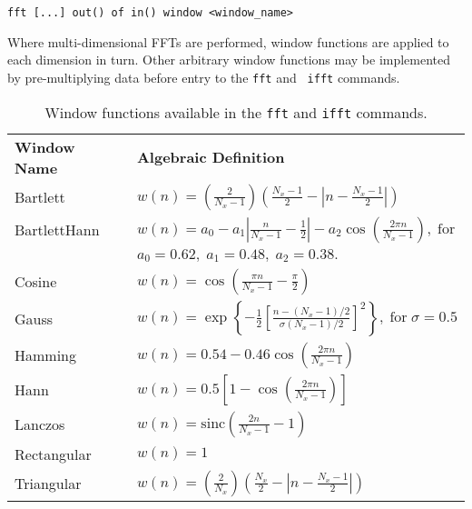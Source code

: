 \begin{verbatim}
fft [...] out() of in() window <window_name>
\end{verbatim}

\noindent Where multi-dimensional FFTs are performed, window functions are
applied to each dimension in turn.  Other arbitrary window functions may be
implemented by pre-multiplying data before entry to the {\tt fft} and {\tt
ifft} commands.

\begin{table}
\newlength{\wfgap}
\setlength{\wfgap}{3mm}
\begin{tabular}{ll}
{\bf Window Name} & {\bf Algebraic Definition} \vspace{\wfgap}\\
Bartlett     & $\displaystyle w(n) = \left( \frac{2}{N_x-1} \right) \left( \frac{N_x-1}{2} - \left| n - \frac{N_x-1}{2} \right| \right)$ \vspace{\wfgap}\\
BartlettHann & $\displaystyle w(n) = a_0 - a_1\left|\frac{n}{N_x-1}-\frac{1}{2}\right| - a_2\cos\left(\frac{2\pi n}{N_x-1}\right),\;\textrm{for}$ \vspace{2mm}\\
             & $a_0=0.62,\; a_1=0.48,\; a_2=0.38.$ \vspace{\wfgap}\\
Cosine       & $\displaystyle w(n) = \cos\left(\frac{\pi n}{N_x-1} - \frac{\pi}{2} \right)$ \vspace{\wfgap}\\
Gauss        & $\displaystyle w(n) = \exp \left\{ -\frac{1}{2}\left[ \frac{n-(N_x-1)/2}{\sigma(N_x-1)/2} \right]^2 \right\},\;\textrm{for}\;\sigma=0.5$ \vspace{\wfgap}\\
Hamming      & $\displaystyle w(n) = 0.54 - 0.46\cos\left(\frac{2\pi n}{N_x-1}\right)$ \vspace{\wfgap}\\
Hann         & $\displaystyle w(n) = 0.5 \left[ 1 - \cos\left(\frac{2\pi n}{N_x-1}\right) \right]$ \vspace{\wfgap}\\
Lanczos      & $\displaystyle w(n) = \mathrm{sinc}\left( \frac{2n}{N_x-1} - 1 \right)$ \vspace{\wfgap}\\
Rectangular  & $\displaystyle w(n) = 1$ \vspace{\wfgap}\\
Triangular   & $\displaystyle w(n) = \left( \frac{2}{N_x} \right) \left( \frac{N_x}{2} - \left| n - \frac{N_x-1}{2} \right| \right)$ \vspace{\wfgap}\\
\end{tabular}
\caption{Window functions available in the {\tt fft} and {\tt ifft} commands.}
\label{tab:windowfuncs}
\end{table}

